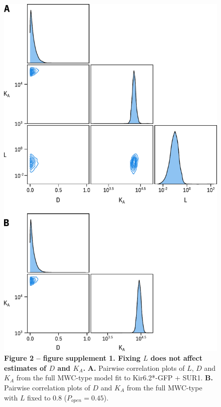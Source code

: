 \documentclass[9pt,lineno, onehalfspacing]{elife_modified}
\begin{document}
\begin{figure}
\begin{fullwidth}
\includegraphics[height=0.95\textheight]{figure_two_s1}
\captionsetup{labelformat=empty}
\caption{
\textbf{Figure 2 -- figure supplement 1. Fixing $L$ does not affect estimates of $D$ and $K_A$.}
\textbf{A.}
Pairwise correlation plots of $L$, $D$ and $K_A$ from the full MWC-type model fit to Kir6.2*-GFP + SUR1.
\textbf{B.}
Pairwise correlation plots of $D$ and $K_A$ from the full MWC-type with $L$ fixed to 0.8 ($P_{open} = 0.45$).
}
\label{fig:two_s1}
\end{fullwidth}
\end{figure}
\end{document}
